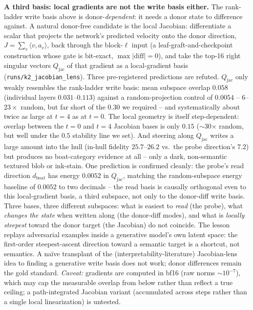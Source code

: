 \documentclass[10pt,twocolumn,letterpaper]{article}
\begin{document}
\textbf{A third basis: local gradients are not the write basis
either.} The rank-ladder write basis above is donor-\emph{dependent}:
it needs a donor state to difference against. A natural donor-free
candidate is the local Jacobian: differentiate a scalar that projects
the network's predicted velocity onto the donor direction, $J =
\sum_v\langle v, a_v\rangle$, back through the block-$\ell$ input (a
leaf-graft-and-checkpoint construction whose gate is bit-exact,
$\max|\text{diff}|=0$), and take the top-16 right singular vectors
$Q_{\text{jac}}$ of that gradient as a local-gradient basis
(\texttt{runs/k2\_jacobian\_lens}). Three pre-registered predictions
are refuted. $Q_{\text{jac}}$ only weakly resembles the rank-ladder
write basis: mean subspace overlap $0.058$ (individual layers
$0.031$--$0.113$) against a random-projection control of $0.0054$ --
$6$--$23\times$ random, but far short of the $0.30$ we required -- and
systematically about twice as large at $t{=}4$ as at $t{=}0$. The
local geometry is itself step-dependent: overlap between the $t{=}0$
and $t{=}4$ Jacobian bases is only $0.15$ ($\sim$30$\times$ random,
but well under the $0.5$ stability line we set). And steering along
$Q_{\text{jac}}$ writes a large amount into the hull (in-hull fidelity
$25.7$--$26.2$ vs.\ the probe direction's $7.2$) but produces no
boat-category evidence at all -- only a dark, non-semantic textured
blob or ink-stain. One prediction is confirmed cleanly: the probe's
read direction $d_{\text{boat}}$ has energy $0.0052$ in
$Q_{\text{jac}}$, matching the random-subspace energy baseline of
$0.0052$ to two decimals -- the read basis is causally orthogonal even
to this local-gradient basis, a third subspace, not only to the
donor-diff write basis. Three bases, three different subspaces: what
is easiest to \emph{read} (the probe), what \emph{changes the state}
when written along (the donor-diff modes), and what is
\emph{locally steepest} toward the donor target (the Jacobian) do not
coincide. The lesson replays adversarial examples inside a generative
model's own latent space: the first-order steepest-ascent direction
toward a semantic target is a shortcut, not semantics. A na\"ive
transplant of the (interpretability-literature) Jacobian-lens idea to
finding a generative write basis does not work; donor differences
remain the gold standard. \emph{Caveat:} gradients are computed in
bf16 (raw norms $\sim10^{-7}$), which may cap the measurable overlap
from below rather than reflect a true ceiling; a path-integrated
Jacobian variant (accumulated across steps rather than a single local
linearization) is untested.
\end{document}
